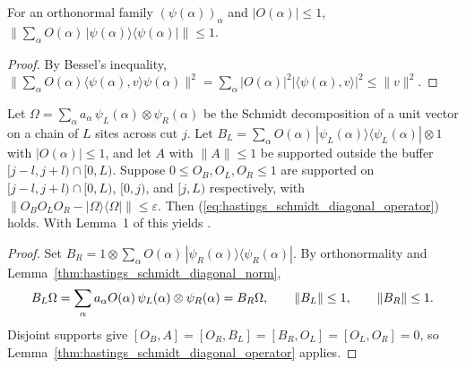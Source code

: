 \begin{lemma}
    \label{thm:hastings_schmidt_diagonal_norm}
    \leanok
    For an orthonormal family $(\psi(\alpha))_\alpha$ and $|O(\alpha)|\le1$,
    $\bigl\|\sum_\alpha O(\alpha)\,|\psi(\alpha)\rangle\langle\psi(\alpha)|\bigr\|\le1$.
\end{lemma}
\begin{proof}\leanok
    By Bessel's inequality,
    $\|\sum_\alpha O(\alpha)\langle\psi(\alpha),v\rangle\psi(\alpha)\|^2
        =\sum_\alpha|O(\alpha)|^2|\langle\psi(\alpha),v\rangle|^2\le\|v\|^2$.
\end{proof}

\begin{lemma}
    \label{thm:hastings_schmidt_diagonal_chain}
    \leanok
    Let $\Omega=\sum_\alpha a_\alpha\,\psi_L(\alpha)\otimes\psi_R(\alpha)$ be the
    Schmidt decomposition of a unit vector on a chain of $L$ sites across cut
    $j$. Let
    $B_L=\sum_\alpha O(\alpha)\,|\psi_L(\alpha)\rangle\langle\psi_L(\alpha)|\otimes1$
    with $|O(\alpha)|\le1$, and let $A$ with $\|A\|\le1$ be supported outside
    the buffer $\lbrack j-l,j+l)\cap\lbrack0,L)$. Suppose $0\le O_B,O_L,O_R\le1$ are
    supported on $\lbrack j-l,j+l)\cap\lbrack0,L)$, $\lbrack0,j)$, and $\lbrack j,L)$ respectively, with
    $\|O_BO_LO_R-|\Omega\rangle\langle\Omega|\|\le\varepsilon$. Then
    (\ref{eq:hastings_schmidt_diagonal_operator}) holds. With Lemma~1 of
    \cite{Hastings2007AreaLaw} this yields \cite[Lemma~3, eq.~(fwdback)]{Hastings2007AreaLaw}.
\end{lemma}
\begin{proof}\leanok
    Set $B_R=1\otimes\sum_\alpha O(\alpha)\,|\psi_R(\alpha)\rangle\langle\psi_R(\alpha)|$.
    By orthonormality and Lemma~\ref{thm:hastings_schmidt_diagonal_norm},
    \begin{align}
        B_L\Omega=\sum_\alpha a_\alpha O(\alpha)\,\psi_L(\alpha)\otimes\psi_R(\alpha)=B_R\Omega,
        \qquad \|B_L\|\le1,\qquad \|B_R\|\le1.
        \notag
    \end{align}
    Disjoint supports give $[O_B,A]=[O_R,B_L]=[B_R,O_L]=[O_L,O_R]=0$, so
    Lemma~\ref{thm:hastings_schmidt_diagonal_operator} applies.
\end{proof}

